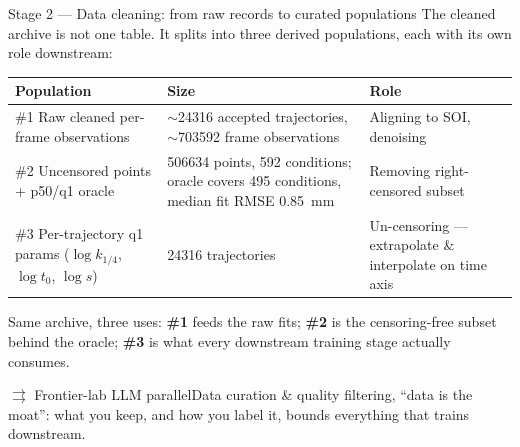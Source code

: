 \documentclass[aspectratio=169,11pt]{beamer}
\newcommand{\blue}[1]{\textcolor{aaltoBlue}{#1}}
\newcommand{\llmparallel}[1]{%
  \begin{block}{$\rightrightarrows$ Frontier-lab LLM parallel}#1\end{block}}
\begin{document}
\begin{frame}{Stage 2 --- Data cleaning: from raw records to curated populations}
\small
The cleaned archive is not one table. It splits into three derived populations, each with its own role downstream:
\smallskip
\begin{center}
\renewcommand{\arraystretch}{1.1}
\scriptsize
\begin{tabular}{@{}L{4.4cm}L{5.6cm}L{3.0cm}@{}}
\toprule
\textbf{Population} & \textbf{Size} & \textbf{Role} \\
\midrule
\#1 Raw cleaned per-frame observations &
$\sim$\num{24316} accepted trajectories, $\sim$\num{703592} frame observations & Aligning to SOI, denoising\\
\#2 Uncensored points + p50/q1 oracle &
\num{506634} points, 592 conditions; oracle covers 495 conditions, median fit RMSE \SI{0.85}{mm} & Removing right-censored subset\\
\#3 Per-trajectory q1 params ($\log k_{1/4}$, $\log t_0$, $\log s$) &
\num{24316} trajectories & Un-censoring --- extrapolate \& interpolate on time axis\\
\bottomrule
\end{tabular}
\end{center}
\smallskip
{\footnotesize Same archive, three uses: \textbf{\#1} feeds the raw fits; \textbf{\#2} is the censoring-free
subset behind the oracle; \textbf{\#3} is what every downstream training stage actually consumes.}
\smallskip
\llmparallel{Data curation \& quality filtering, \blue{``data is the moat''}: what you keep, and how you label it, bounds everything that trains downstream.}
\end{frame}
\end{document}
